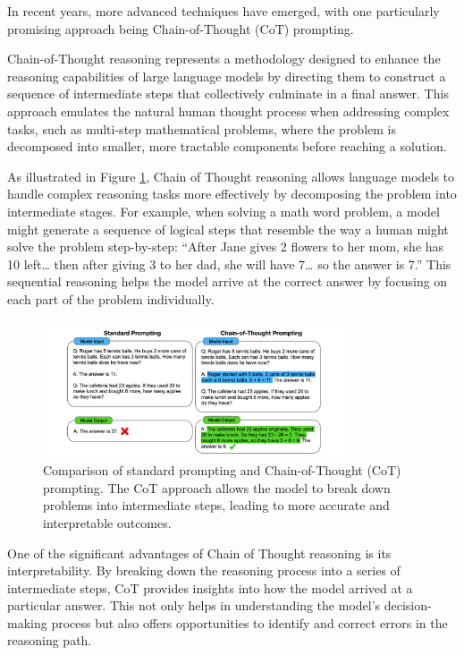 In recent years, more advanced techniques have emerged, with one particularly promising approach being Chain-of-Thought (CoT) prompting.

Chain-of-Thought reasoning represents a methodology designed to enhance the reasoning capabilities of large language models by directing them to construct a sequence of intermediate steps that collectively culminate in a final answer. This approach emulates the natural human thought process when addressing complex tasks, such as multi-step mathematical problems, where the problem is decomposed into smaller, more tractable components before reaching a solution.

As illustrated in Figure \ref{fig:cot_reasoning}, Chain of Thought reasoning allows language models to handle complex reasoning tasks more effectively by decomposing the problem into intermediate stages. For example, when solving a math word problem, a model might generate a sequence of logical steps that resemble the way a human might solve the problem step-by-step: “After Jane gives 2 flowers to her mom, she has 10 left… then after giving 3 to her dad, she will have 7… so the answer is 7.” This sequential reasoning helps the model arrive at the correct answer by focusing on each part of the problem individually.

\begin{figure}[h]
    \centering
    \includegraphics[width=0.8\textwidth]{images/llms/cot-resoning.png}
    \caption{Comparison of standard prompting and Chain-of-Thought (CoT) prompting. The CoT approach allows the model to break down problems into intermediate steps, leading to more accurate and interpretable outcomes.}
    \label{fig:cot_reasoning}
\end{figure}

One of the significant advantages of Chain of Thought reasoning is its interpretability. By breaking down the reasoning process into a series of intermediate steps, CoT provides insights into how the model arrived at a particular answer. This not only helps in understanding the model’s decision-making process but also offers opportunities to identify and correct errors in the reasoning path.

